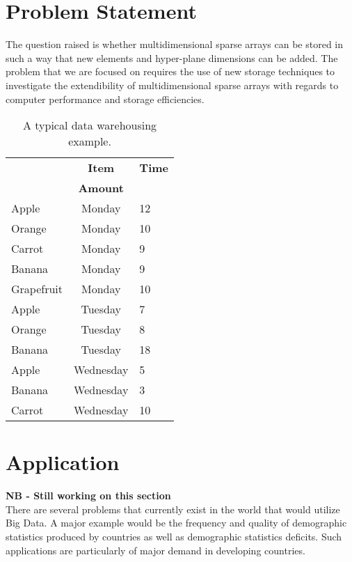 \section{Problem Statement}
The question raised is whether multidimensional sparse arrays can be stored in such a way that new elements and hyper-plane dimensions can be added. The problem that we are focused on requires the use of new storage techniques to investigate the extendibility of multidimensional sparse arrays with regards to computer performance and storage efficiencies.

\begin{table}[htb]
	\caption{A typical data warehousing example.\label{tab:fonts}}
	\begin{center}
		\begin{tabular}{p{26mm}cp{35mm}}
			\hline
			&   {\textbf{Item}} & {\textbf{Time}} \\
			&   {\textbf{ Amount}} & \\
			\hline
			Apple   & Monday & 12 \\
			Orange  & Monday & 10\\
			Carrot  & Monday & 9\\
			Banana  & Monday & 9\\
			Grapefruit & Monday & 10\\
			Apple   & Tuesday & 7 \\
			Orange  & Tuesday & 8 \\
			Banana	& Tuesday & 18 \\
			Apple   & Wednesday & 5 \\
			Banana  & Wednesday & 3\\
			Carrot  & Wednesday & 10\\
			\hline
		\end{tabular}
	\end{center}
\end{table}

\section{Application}
\textbf{NB - Still working on this section}\\
There are several problems that currently exist in the world that would utilize Big Data. A major example would be the frequency and quality of demographic statistics produced by countries as well as demographic statistics deficits. Such applications are particularly of major demand in developing countries.


